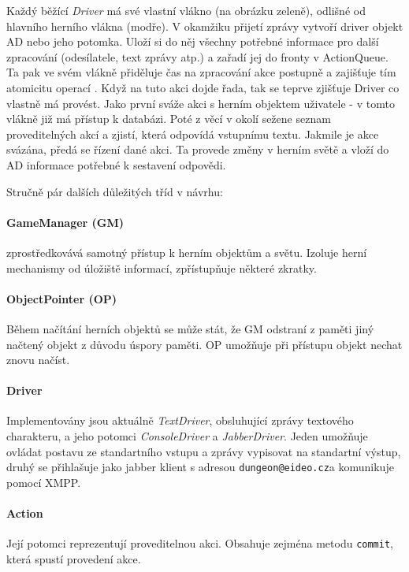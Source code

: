\documentclass[11pt, a4paper]{article}
\makeatletter
\def\class#1{\emph{#1}}
\def\jid{\texttt{dungeon@eideo.cz}}
\makeatother
\begin{document}
Každý běžící \class{Driver} má své vlastní vlákno (na obrázku zeleně), odlišné od hlavního herního vlákna (modře). V okamžiku přijetí zprávy vytvoří driver objekt AD nebo jeho potomka. Uloží si do něj všechny potřebné informace pro další zpracování (odesílatele, text zprávy atp.) a  zařadí jej do fronty v ActionQueue. Ta pak ve svém vlákně přiděluje čas na zpracování akce postupně a zajišťuje tím atomicitu operací . Když na tuto akci dojde řada, tak se teprve zjišťuje Driver co vlastně má provést. Jako první sváže akci s herním objektem uživatele - v tomto vlákně již má přístup k databázi. Poté z věcí v okolí sežene seznam proveditelných akcí a zjistí, která odpovídá vstupnímu textu. Jakmile je akce svázána, předá se řízení dané akci. Ta provede změny v herním světě a vloží do AD informace potřebné k sestavení odpovědi.

Stručně pár dalších důležitých tříd v návrhu:

\paragraph{GameManager (GM)} zprostředkovává samotný přístup k herním objektům a světu. Izoluje herní mechanismy od úložiště informací, zpřístupňuje některé zkratky.

\paragraph{ObjectPointer (OP)} Během načítání herních objektů se může stát, že GM odstraní z paměti jiný načtený objekt z důvodu úspory paměti. OP umožňuje při přístupu objekt nechat znovu načíst.

\paragraph{Driver} Implementovány jsou aktuálně \class{TextDriver}, obsluhující zprávy textového charakteru, a jeho potomci \class{ConsoleDriver} a \class{JabberDriver}. Jeden umožňuje ovládat postavu ze standartního vstupu a zprávy vypisovat na standartní výstup, druhý se přihlašuje jako jabber klient s adresou \jid a komunikuje pomocí XMPP.

\paragraph{Action} Její potomci reprezentují proveditelnou akci. Obsahuje zejména metodu \texttt{commit}, která spustí provedení akce.
\end{document}
